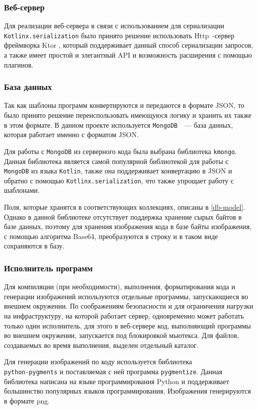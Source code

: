 \subsubsection{Веб-сервер}
Для реализации веб-сервера в связи с использованием для сериализации \texttt{Kotlinx.serialization}
было принято решение использовать Http~-сервер фреймворка Ktor \cite{ktor}, который поддерживает
данный способ сериализации запросов, а также имеет простой и элегантный API и возможность расширения
с помощью плагинов.

\subsubsection{База данных}
\label{db}
Так как шаблоны программ конвертируются и передаются в формате JSON, то было принято решение
переиспользовать имеющуюся логику и хранить их также в этом формате. В данном проекте используется
\texttt{MongoDB}~\cite{mongodb}~--- база данных, которая работает именно с форматом JSON.

Для работы с \texttt{MongoDB} из серверного кода была выбрана библиотека \texttt{kmongo}. Данная
библиотека является самой популярной библиотекой для работы с \texttt{MongoDB} из языка
\texttt{Kotlin}, также она поддерживает конвертацию в JSON и обратно с помощью
\texttt{Kotlinx.serialization}, что также упрощает работу с шаблонами.

Поля, которые хранятся в соответствующих коллекциях, описаны в \ref{db-model}. Однако в
данной библиотеке отсутствует поддержка хранение сырых байтов в базе данных, поэтому для
хранения изображения кода в базе байты изображения, с помощью алгоритма Base64\cite{rfc4648},
преобразуются в строку и в таком виде сохраняются в базу.

\subsubsection{Исполнитель программ}
Для компиляции (при необходимости), выполнения, форматирования кода и генерации изображений используются
отдельные программы, запускающиеся во внешнем окружении. По соображениям безопасности и для
ограничения нагрузки на инфраструктуру, на которой работает сервер, одновременно может работать
только один исполнитель, для этого в веб-сервере код, выполняющий программы во внешнем окружении,
запускается под блокировкой мьютекса. Для файлов, создаваемых во время выполнения, выделен
отдельный каталог.

Для генерации изображений по коду используется библиотека\\
\texttt{python-pygments}\cite{pygments} и поставляемая
с ней программа \texttt{pygmentize}. Данная библиотека написана на языке программирования
Python\cite{python} и поддерживает большинство популярных языков
программирования\cite{pygments-languages}. Изображения генерируются в формате png.

